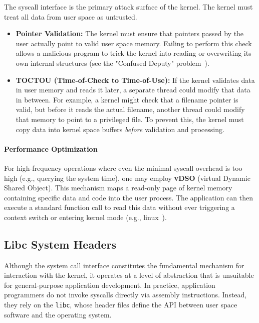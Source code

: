 \documentclass[a4paper,10pt,twoside]{report}
\theoremstyle{definition}
\begin{document}
The syscall interface is the primary attack surface of the kernel. The kernel must treat all data from user space as untrusted.
\begin{itemize}
    \item \textbf{Pointer Validation:} The kernel must ensure that pointers passed by the user actually point to valid user space memory. Failing to perform this check allows a malicious program to trick the kernel into reading or overwriting its own internal structures (see the "Confused Deputy" problem~\cite{confused_deputy_problem}).
    \item \textbf{TOCTOU (Time-of-Check to Time-of-Use):} If the kernel validates data in user memory and reads it later, a separate thread could modify that data in between. For example, a kernel might check that a filename pointer is valid, but before it reads the actual filename, another thread could modify that memory to point to a privileged file. To prevent this, the kernel must copy data into kernel space buffers \textit{before} validation and processing.
\end{itemize}

\paragraph{Performance Optimization}

For high-frequency operations where even the minimal syscall overhead is too high (e.g., querying the system time), one may employ \textbf{vDSO} (virtual Dynamic Shared Object). This mechanism maps a read-only page of kernel memory containing specific data and code into the user process. The application can then execute a standard function call to read this data without ever triggering a context switch or entering kernel mode (e.g., linux~\cite{linux_vdso}).

\subsection{Libc System Headers}
\label{subsec:libc_headers}

Although the system call interface constitutes the fundamental mechanism for interaction with the kernel, it operates at a level of abstraction that is unsuitable for general-purpose application development. In practice, application programmers do not invoke syscalls directly via assembly instructions. Instead, they rely on the \texttt{libc}, whose header files define the API between user space software and the operating system.
\end{document}
